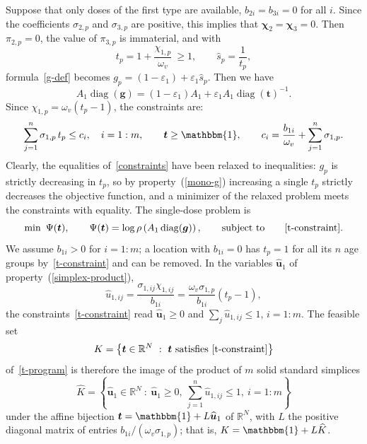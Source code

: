 \documentclass[11pt]{article}
\theoremstyle{plain}
\theoremstyle{definition}
\theoremstyle{remark}
\numberwithin{equation}{section}
\numberwithin{figure}{section}
\numberwithin{table}{section}
\begin{document}
Suppose that only doses of the first type are available, $b_{2i}=b_{3i}=0$ for
all $i$. Since the coefficients
$\sigma_{2,p}$ and $\sigma_{3,p}$ are positive, this implies that
$\bm\chi_2=\bm\chi_3=0$. Then $\pi_{2,p}=0$, the value of
$\pi_{3,p}$ is
immaterial, and with
\begin{equation}\label{t-def}
t_p=1+\frac{\chi_{1,p}}{\omega_v}\ \ge 1,\qquad \widehat s_p=\frac{1}{t_p},
\end{equation}
formula~\eqref{g-def} becomes
$g_p=(1-\varepsilon_1)+\varepsilon_1\widehat s_p$. Then we have
\begin{equation}\label{split}
A_1\operatorname{diag}(\bm g)=(1-\varepsilon_1)A_1+\varepsilon_1A_1\operatorname{diag}(\bm t)^{-1}.
\end{equation}
Since $\chi_{1,p}=\omega_v(t_p-1)$, the constraints are:
\begin{equation}\label{t-constraint}
\sum_{j=1}^{n}\sigma_{1,p}\,t_p\le c_i,\quad i=1:m,\qquad \bm t\ge\mathbbm{1},
\qquad c_i=\frac{b_{1i}}{\omega_v}+\sum_{j=1}^{n}\sigma_{1,p}.
\end{equation}
Clearly, the equalities of~\eqref{constraints} have been relaxed to inequalities:
$g_p$ is strictly decreasing in $t_p$, so by property~(\ref{mono-g}) increasing a single
$t_p$ strictly decreases the objective function, and a minimizer of the relaxed problem
meets the constraints with equality. The single-dose problem is
\begin{equation}\label{t-program}
\min\ \Psi(\bm t),\qquad
\Psi(\bm t)=\log\rho\left(A_1\operatorname{diag}(\bm g)\right),
\qquad\mbox{subject to}\qquad\eqref{t-constraint} .
\end{equation}
We assume $b_{1i}>0$ for $i=1:m$; a location with $b_{1i}=0$ has $t_p=1$ for
all its $n$ age groups by~\eqref{t-constraint} and can be removed. In the
variables $\widehat{\bm u}_1$ of property~(\ref{simplex-product}),
\begin{equation}\label{w-def}
\widehat u_{1,ij}=\frac{\sigma_{1,ij}\chi_{1,ij}}{b_{1i}}
=\frac{\omega_v\sigma_{1,p}}{b_{1i}}\left(t_p-1\right),
\end{equation}
the constraints~\eqref{t-constraint} read $\widehat{\bm u}_1\ge 0$ and
$\sum_j\widehat u_{1,ij}\le 1$, $i=1:m$. The feasible set
\begin{equation}\label{Kt-def}
K=\left\{\bm t\in\mathbb{R}^N\ :\ \bm t\ \mbox{satisfies~\eqref{t-constraint}}\right\}
\end{equation}
of~\eqref{t-program} is therefore the image of the product of $m$ solid
standard simplices
\begin{equation}\label{K-def}
\widehat K=\left\{\widehat{\bm u}_1\in\mathbb{R}^{N}\ :\ \widehat{\bm u}_1\ge 0,\
\sum_{j=1}^{n}\widehat u_{1,ij}\le 1,\ i=1:m\right\}
\end{equation}
under the affine bijection $\bm t=\mathbbm{1}+L\widehat{\bm u}_1$ of
$\mathbb{R}^N$, with $L$ the positive diagonal matrix of entries
$b_{1i}/\left(\omega_v\sigma_{1,p}\right)$; that is,
$K=\mathbbm{1}+L\widehat K$.
\end{document}
